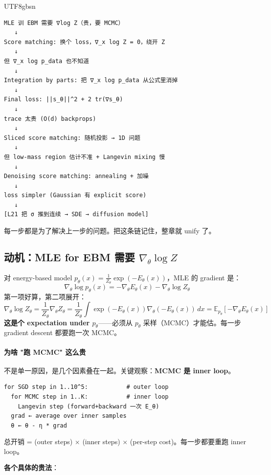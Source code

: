 \documentclass[11pt]{article}
\begin{document}
\begin{CJK}{UTF8}{gbsn}
\begin{verbatim}
MLE 训 EBM 需要 ∇log Z（贵，要 MCMC）
   ↓
Score matching: 换个 loss，∇_x log Z = 0，绕开 Z
   ↓
但 ∇_x log p_data 也不知道
   ↓
Integration by parts: 把 ∇_x log p_data 从公式里消掉
   ↓
Final loss: ||s_θ||^2 + 2 tr(∇s_θ)
   ↓
trace 太贵 (O(d) backprops)
   ↓
Sliced score matching: 随机投影 → 1D 问题
   ↓
但 low-mass region 估计不准 + Langevin mixing 慢
   ↓
Denoising score matching: annealing + 加噪
   ↓
loss simpler (Gaussian 有 explicit score)
   ↓
[L21 把 σ 推到连续 → SDE → diffusion model]
\end{verbatim}

每一步都是为了解决上一步的问题。把这条链记住，整章就 unify 了。

\subsection{动机：MLE for EBM 需要 $\nabla_\theta \log Z$}

对 energy-based model $p_\theta(x) = \frac{1}{Z_\theta} \exp(-E_\theta(x))$，MLE 的 gradient 是：
\[
  \nabla_\theta \log p_\theta(x) = -\nabla_\theta E_\theta(x) - \nabla_\theta \log Z_\theta
\]
第一项好算，第二项展开：
\[
  \nabla_\theta \log Z_\theta = \frac{1}{Z_\theta} \nabla_\theta Z_\theta = \frac{1}{Z_\theta} \int \exp(-E_\theta(x)) \nabla_\theta(-E_\theta(x)) \, dx = \mathbb{E}_{p_\theta}[-\nabla_\theta E_\theta(x)]
\]
\textbf{这是个 expectation under $p_\theta$}——必须从 $p_\theta$ 采样（MCMC）才能估。每一步 gradient descent 都要跑一次 MCMC。

\paragraph{为啥 "跑 MCMC" 这么贵}

不是单一原因，是几个因素叠在一起。关键观察：\textbf{MCMC 是 inner loop}。

\begin{verbatim}
for SGD step in 1..10^5:           # outer loop
  for MCMC step in 1..K:           # inner loop
    Langevin step (forward+backward 一次 E_θ)
  grad ← average over inner samples
  θ ← θ - η * grad
\end{verbatim}

总开销 = (outer steps) $\times$ (inner steps) $\times$ (per-step cost)。每一步都要重跑 inner loop。

\textbf{各个具体的贵法}：


\end{CJK}
\end{document}
